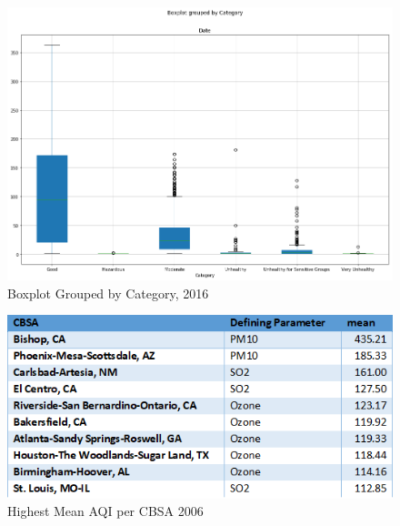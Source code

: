 \documentclass[sigconf]{acmart}
\begin{document}
\begin{figure}[htb]
\includegraphics[width=1.0\columnwidth]{images/boxplotofcountofaqibycategory2016.png}
  \caption{Boxplot Grouped by Category, 2016}
  \label{boxplot}
\end{figure}

\begin{figure}[htb]
\includegraphics[width=1.0\columnwidth]{images/top10cbsamean2006.png}
  \caption{Highest Mean AQI per CBSA 2006}
  \label{Highest Mean AQI per CBSA 2006}
\end{figure}
\end{document}
